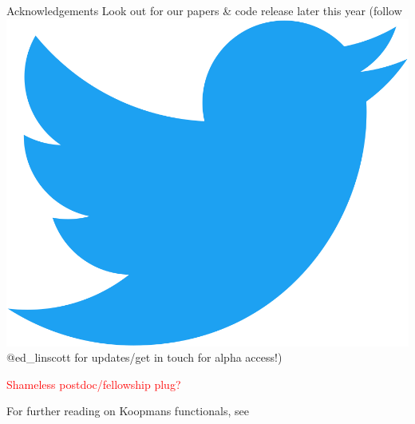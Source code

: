 \documentclass[xcolor=table,aspectratio=169]{beamer}
\numberwithin{equation}{section}
\begin{document}
\begin{frame}{Acknowledgements}
   Look out for our papers \& code release later this year (follow \includegraphics[height=\fontcharht\font`\B]{figures/Twitter_Bird.png} \textcolor{twitter_blue}{@ed\_linscott} for updates/get in touch for alpha access!)

   \textcolor{red}{Shameless postdoc/fellowship plug?}

   \scriptsize


   \vspace{2ex}
   \scriptsize
   For further reading on Koopmans functionals, see\cite{Dabo2010,Borghi2014,Nguyen2018,Colonna2018,Colonna2019}
\end{frame}
\end{document}

